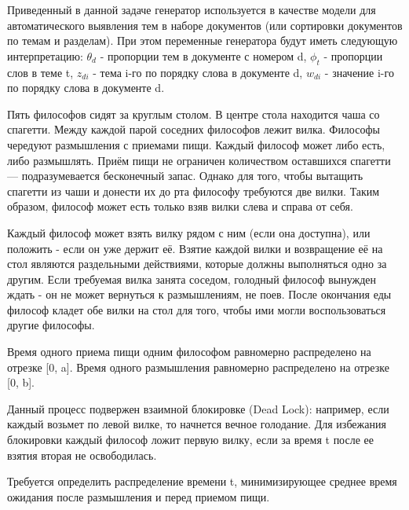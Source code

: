 \begin{problem}
\begin{ordre}
\end{ordre}

\begin{remark}
 Приведенный в данной задаче генератор используется в качестве модели для автоматического выявления  тем в наборе документов (или сортировки документов по темам и разделам). При этом переменные генератора будут иметь следующую интерпретацию: $\theta_d$ - пропорции тем в документе с номером d, 
$\phi_t$ - пропорции слов в теме t,
$z_{di}$ - тема i-го по порядку слова в документе d, 
$w_{di}$ - значение i-го по порядку слова в документе d.
\end{remark}

\end{problem}

\begin{problem}
Пять философов сидят за круглым столом. В центре стола находится чаша со
спагетти. Между каждой парой соседних философов лежит вилка. Философы чередуют размышления с приемами пищи. Каждый философ может либо есть, либо размышлять. Приём пищи не ограничен
количеством оставшихся спагетти — подразумевается бесконечный запас. Однако
для того, чтобы вытащить спагетти из чаши и донести их до рта философу требуются
две вилки. Таким образом, философ может есть только взяв вилки слева и справа от
себя. 

Каждый философ может взять вилку рядом с ним (если она доступна), или положить
- если он уже держит её. Взятие каждой вилки и возвращение её на стол являются
раздельными действиями, которые должны выполняться одно за другим. Если
требуемая вилка занята соседом, голодный философ вынужден ждать - он не
может вернуться к размышлениям, не поев. После окончания еды философ кладет
обе вилки на стол для того, чтобы ими могли воспользоваться другие философы.

Время одного приема пищи одним философом равномерно распределено на отрезке [0, a]. 
Время одного размышления равномерно распределено на отрезке [0, b].

Данный процесс подвержен взаимной блокировке (Dead Lock): например, если каждый возьмет по левой вилке, то начнется вечное голодание. Для избежания блокировки каждый философ ложит первую вилку, если за время t после ее взятия вторая не освободилась.

Требуется определить распределение времени t, минимизирующее среднее время ожидания после размышления и перед приемом пищи.

\end{problem}


